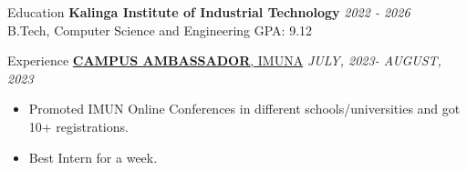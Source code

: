 \documentclass{resume} %
\begin{document}

\begin{rSection}{Education}
{\bf Kalinga Institute of Industrial Technology} \hfill {\em 2022 - 2026} 
\\ B.Tech, Computer Science and Engineering \hfill { GPA: 9.12 }
\\ 


\end{rSection}
\begin{rSection}{Experience}
\href{https://1drv.ms/i/s!AqmF3ryI8xyngdlvi5puoHlWRF5NTQ?e=hyfCRH}{{\bf CAMPUS AMBASSADOR}{, IMUNA}} \hfill {\em JULY, 2023- AUGUST, 2023}
\begin{itemize}
    \item Promoted IMUN Online Conferences in different schools/universities and got 10+ registrations.
    \item Best Intern for a week.
\end{itemize}
\end{rSection}
\end{document}
